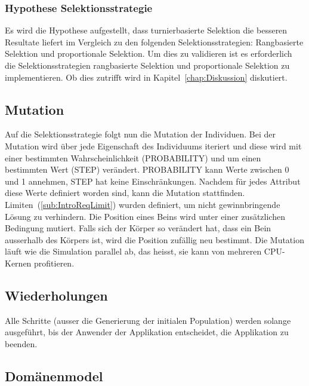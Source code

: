       \subsubsection{Hypothese Selektionsstrategie\label{sub:Hypothese Selektionsstrategie}}

        Es wird die Hypothese aufgestellt,
        dass turnierbasierte Selektion die besseren Resultate liefert im Vergleich zu den folgenden Selektionsstrategien: Rangbasierte Selektion und proportionale Selektion.
        Um dies zu validieren ist es erforderlich die Selektionsstrategien rangbasierte Selektion und proportionale Selektion zu implementieren.
        Ob dies zutrifft wird in Kapitel~\ref{chap:Diskussion} diskutiert.

    \subsection{Mutation\label{sec:Mutation}}

      Auf die Selektionsstrategie folgt nun die Mutation der Individuen.
      Bei der Mutation wird über jede Eigenschaft des Individuums iteriert und
      diese wird mit einer bestimmten Wahrscheinlichkeit (PROBABILITY) und um einen bestimmten Wert (STEP) verändert.
      PROBABILITY kann Werte zwischen 0 und 1 annehmen, STEP hat keine Einschränkungen.
      Nachdem für jedes Attribut diese Werte definiert worden sind, kann die Mutation stattfinden.
      Limiten~(\vref{sub:IntroReqLimit}) wurden definiert, um nicht gewinnbringende Lösung zu verhindern.
      Die Position eines Beins wird unter einer zusätzlichen Bedingung mutiert. Falls sich der Körper so verändert hat,
      dass ein Bein ausserhalb des Körpers ist, wird die Position zufällig neu bestimmt.
      Die Mutation läuft wie die Simulation parallel ab, das heisst, sie kann von mehreren CPU-Kernen profitieren.

    \subsection{Wiederholungen}

      Alle Schritte (ausser die Generierung der initialen Population) werden solange ausgeführt,
      bis der Anwender der Applikation entscheidet, die Applikation zu beenden.

    \subsection{Domänenmodel\label{sub:domMod}}

